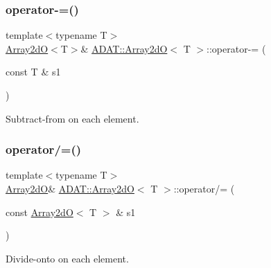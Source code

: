 \subsubsection{\texorpdfstring{operator-\/=()}{operator-=()}\hspace{0.1cm}{\footnotesize\ttfamily [4/4]}}
{\footnotesize\ttfamily template$<$typename T$>$ \\
\mbox{\hyperlink{classADAT_1_1Array2dO}{Array2dO}}$<$T$>$\& \mbox{\hyperlink{classADAT_1_1Array2dO}{A\+D\+A\+T\+::\+Array2dO}}$<$ T $>$\+::operator-\/= (\begin{DoxyParamCaption}\item[{const T \&}]{s1 }\end{DoxyParamCaption})\hspace{0.3cm}{\ttfamily [inline]}}



Subtract-\/from on each element. 

\mbox{\label{classADAT_1_1Array2dO_a04e77d7a878bbf9ecf4e890848f09009}} 
\subsubsection{\texorpdfstring{operator/=()}{operator/=()}\hspace{0.1cm}{\footnotesize\ttfamily [1/4]}}
{\footnotesize\ttfamily template$<$typename T$>$ \\
\mbox{\hyperlink{classADAT_1_1Array2dO}{Array2dO}}\& \mbox{\hyperlink{classADAT_1_1Array2dO}{A\+D\+A\+T\+::\+Array2dO}}$<$ T $>$\+::operator/= (\begin{DoxyParamCaption}\item[{const \mbox{\hyperlink{classADAT_1_1Array2dO}{Array2dO}}$<$ T $>$ \&}]{s1 }\end{DoxyParamCaption})\hspace{0.3cm}{\ttfamily [inline]}}



Divide-\/onto on each element. 

\mbox{\label{classADAT_1_1Array2dO_a04e77d7a878bbf9ecf4e890848f09009}} 
